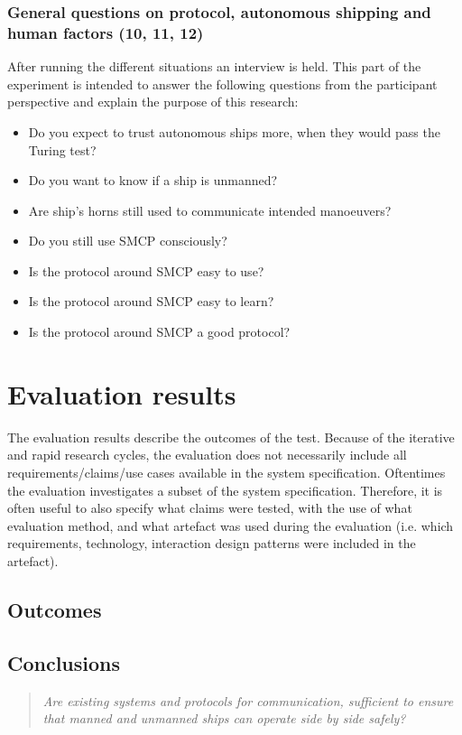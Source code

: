 \subsubsection{General questions on protocol, autonomous shipping and human factors (10, 11, 12)}
After running the different situations an interview is held. This part of the experiment is intended to answer the following questions from the participant perspective and explain the purpose of this research:
\begin{itemize}
	\item Do you expect to trust autonomous ships more, when they would pass the Turing test?
	\item Do you want to know if a ship is unmanned?
	\item Are ship's horns still used to communicate intended manoeuvers?
	\item Do you still use \acf{SMCP}  consciously?
	\item Is the protocol around SMCP easy to use?
	\item Is the protocol around SMCP easy to learn?
	\item Is the protocol around SMCP a good protocol?
\end{itemize}

\section{Evaluation results}
The evaluation results describe the outcomes of the test. Because of the iterative and rapid research cycles, the evaluation does not necessarily include all requirements/claims/use cases available in the system specification. Oftentimes the evaluation investigates a subset of the system specification. Therefore, it is often useful to also specify what claims were tested, with the use of what evaluation method, and what artefact was used during the evaluation (i.e. which requirements, technology, interaction design patterns were included in the artefact).

\subsection{Outcomes}

\subsection{Conclusions}

\begin{quotation}
	\emph{Are existing systems and protocols for communication, sufficient to ensure that manned and unmanned ships can operate side by side safely?}
\end{quotation}
